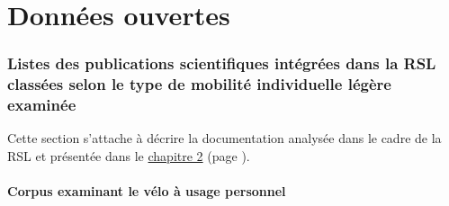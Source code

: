 

    \newpage
\part*{Données ouvertes}
    \label{donnees-ouvertes:titre}
    \renewcommand{\thesection}{\Alph{section}}
    \setcounter{section}{0}

    \newpage
\section{Listes des publications scientifiques intégrées dans la \acrshort{RSL} classées selon le type de \gls{mobilité individuelle légère} examinée}
    \label{donnees-ouvertes:rsl_publications_type_mobilite_individuelle_legere}

Cette section s'attache à décrire la documentation analysée dans le cadre de la \acrfull{RSL} et présentée dans le \hyperref[chap2:titre]{chapitre 2} (page \pageref{chap2:titre}).\par

\subsection{Corpus examinant le vélo à usage personnel}
    \label{donnees-ouvertes:rsl_publications_velo_personnel}

